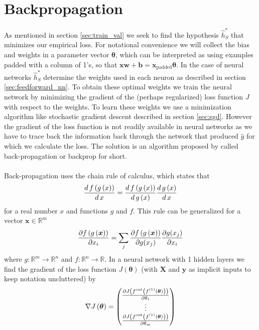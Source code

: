 \section{Backpropagation} \label{sec:backprop}
As mentioned in section \ref{sec:train_val} we seek to find the hypothesis $\hat{h}^*_S$ that minimizes our empirical loss. For notational convenience we will collect the bias and weights in a parameter vector $\boldsymbol{\theta}$, which can be interpreted as using examples padded with a column of 1's, so that $\boldsymbol{x}\boldsymbol{w}+\boldsymbol{b} = \boldsymbol{x}_{\text{padded}} \boldsymbol{\theta}$. In the case of neural networks $\hat{h}^*_S$ determine the weights used in each neuron as described in section \ref{sec:feedforward_nn}. To obtain these optimal weights we train the neural network by minimizing the gradient of the (perhaps regularized) loss function $J$ with respect to the weights. To learn these weights we use a minimization algorithm like stochastic gradient descent described in section \ref{sec:sgd}. However the gradient of the loss function is not readily available in neural networks as we have to trace back the information back through the network that produced $\hat{y}$ for which we calculate the loss. The solution is an algorithm proposed by \cite{Rumelhart:1986a} called back-propagation or backprop for short.\\
\\
Back-propagation uses the chain rule of calculus, which states that
\begin{equation*}
    \frac{d \, f\left (g\left (x\right)\right)}{d \, x} = \frac{d \, f\left (g\left (x\right)\right)}{d \, g \left (x\right)} \frac{d \, g\left (x\right)}{d \, x}
\end{equation*}
for a real number $x$ and functions $g$ and $f$. This rule can be generalized for a vector $\boldsymbol{x} \in \mathbb{R}^m$
\begin{equation*}
    \frac{\partial f\left (g\left (\boldsymbol{x}\right)\right)}{\partial x_i} = \sum_j \frac{\partial f\left (g\left (\boldsymbol{x}\right)\right)}{\partial g(x_j)} \frac{\partial g(x_j)}{\partial x_i}
\end{equation*}
where $g: \mathbb{R}^m \rightarrow \mathbb{R}^n$ and $f: \mathbb{R}^n \rightarrow \mathbb{R}$. In a neural network with 1 hidden layers we find the gradient of the loss function $J(\boldsymbol{\theta})$ (with $\boldsymbol{X}$ and $\boldsymbol{y}$ as implicit inputs to keep notation uncluttered) by
\begin{equation} \label{eq:loss_grad}
    \nabla J\left (\boldsymbol{\theta}\right) = \begin{pmatrix}
    \frac{\partial J\left (f^{\text{out}} \left (f^{(1)}\left (\boldsymbol{\theta}\right)\right)\right)}{\partial \theta_1} \\
    \vdots\\
    \frac{\partial J\left (f^{\text{out}} \left (f^{(1)}\left (\boldsymbol{\theta}\right)\right)\right)}{\partial \theta_m}
    \end{pmatrix}
\end{equation}
